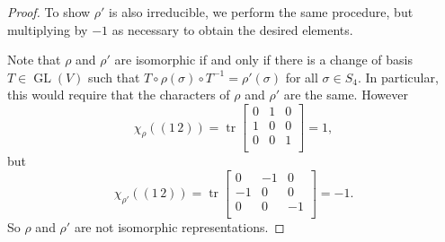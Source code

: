 \documentclass[12pt]{article}
\newcommand{\<}{\langle}
\renewcommand{\>}{\rangle}
\theoremstyle{definition}
\DeclareMathOperator{\GL}{GL}
\begin{document}
\begin{proof}
    To show $\rho'$ is also irreducible, we perform the same procedure, but multiplying by $-1$ as necessary to obtain the desired elements.

    Note that $\rho$ and $\rho'$ are isomorphic if and only if there is a change of basis $T \in \GL(V)$ such that $T \circ \rho(\sigma) \circ T^{-1} = \rho'(\sigma)$ for all $\sigma \in S_4$. In particular, this would require that the characters of $\rho$ and $\rho'$ are the same. However
    \[
        \chi_{\rho}((1 \, 2)) = \operatorname{tr} \begin{bmatrix}
            0 & 1 & 0 \\
            1 & 0 & 0 \\
            0 & 0 & 1 \\
        \end{bmatrix}
        = 1,
    \]
    but
    \[
        \chi_{\rho'}((1 \, 2)) = \operatorname{tr} \begin{bmatrix}
            0 & -1 & 0 \\
            -1 & 0 & 0 \\
            0 & 0 & -1 \\
        \end{bmatrix}
        = -1.
    \]
    So $\rho$ and $\rho'$ are not isomorphic representations.
\end{proof}
\end{document}
